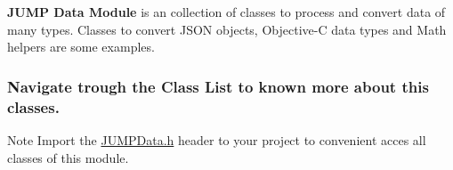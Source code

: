 {\bfseries JUMP Data Module} is an collection of classes to process and convert data of many types. Classes to convert JSON objects, Objective-\/C data types and Math helpers are some examples.\par
 \subsubsection*{Navigate trough the Class List to known more about this classes.}

\begin{DoxyNote}{Note}
Import the \hyperlink{_j_u_m_p_data_8h}{JUMPData.h} header to your project to convenient acces all classes of this module. \par
 
\end{DoxyNote}

